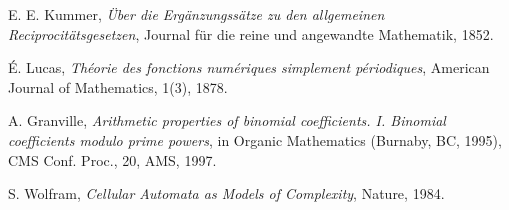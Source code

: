 \documentclass[12pt]{article}
\begin{document}
\begin{thebibliography}{9}

E. E. Kummer,
\textit{Über die Ergänzungssätze zu den allgemeinen Reciprocitätsgesetzen},
Journal für die reine und angewandte Mathematik, 1852.

É. Lucas,
\textit{Théorie des fonctions numériques simplement périodiques},
American Journal of Mathematics, 1(3), 1878.

A. Granville,
\textit{Arithmetic properties of binomial coefficients. I. Binomial coefficients modulo prime powers},
in Organic Mathematics (Burnaby, BC, 1995), CMS Conf. Proc., 20, AMS, 1997.

S. Wolfram,
\textit{Cellular Automata as Models of Complexity},
Nature, 1984.

\end{thebibliography}
\end{document}
